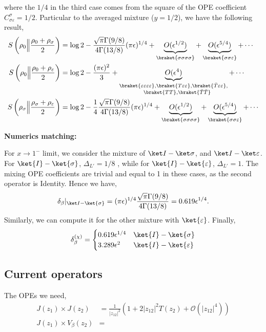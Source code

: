 \documentclass[11pt]{article}
\newcommand{\ep}{\epsilon}
\newcommand{\mO}{\mathcal{O}}
\newcommand{\lb}{\left(}
\newcommand{\rb}{\right)}
\begin{document}
where the $1/4$ in the third case comes from the square of the OPE coefficient $C^\sigma_{\sigma\varepsilon} = 1/2$. Particular to the averaged mixture ($y =1/2$), we have the following result,
\begin{align}
    S\lb \rho_0 \Big\|\frac{\rho_0 + \rho_\sigma}{2}\rb &= \log 2 - \frac{\sqrt \pi \Gamma(9/8)}{4\Gamma (13/8)} (\pi \ep)^{1/4} + \underbrace{O(\ep^{1/2})}_{\braket{\sigma\sigma\sigma\sigma}}+ \underbrace{O(\ep^{5/4})}_{\braket{\sigma\sigma\varepsilon}}+\cdots \\
    S\lb \rho_0 \Big\|\frac{\rho_0 + \rho_\varepsilon}{2}\rb &= \log 2 -  \frac{(\pi \ep)^{2}}{3} + \underbrace{O(\ep^{4})}_{\substack{\braket{\varepsilon\varepsilon\varepsilon\varepsilon} ,\braket{T\varepsilon\varepsilon}, \braket{\bar T \varepsilon\varepsilon},\\\quad \braket{TT},\braket{\bar T \bar T}}}+\cdots \\
    S\lb \rho_\sigma \Big\|\frac{\rho_\sigma + \rho_\varepsilon}{2}\rb &= \log 2 - \frac{1}{4}\frac{\sqrt \pi \Gamma(9/8)}{4\Gamma (13/8)} (\pi \ep)^{1/4} + \underbrace{O(\ep^{1/2})}_{\braket{\sigma\sigma\sigma\sigma}} +\underbrace{O(\ep^{5/4})}_{\braket{\sigma\sigma\varepsilon}}+\cdots 
\end{align}



\textbf{Numerics matching: } 

 For $x \to 1^-$ limit, we consider the mixture of $\ket I -\ket \sigma$, and  $\ket I -\ket \varepsilon$. For $\ket{I}-\ket{\sigma}$, $\Delta_{L'} = 1/8$ , while for $\ket{I}-\ket{\varepsilon}$, $\Delta_{L'} = 1$. The mixing OPE coefficients are trivial and equal to 1 in these cases, as the second operator is Identity. Hence we have,
\begin{align}
    \delta_\beta|_{\ket I-\ket{\sigma}} = (\pi \ep)^{1/4} \frac{\sqrt{\pi} \Gamma(9/8)}{4\Gamma(13/8)} = 0.619 \ep^{1/4}. 
\end{align}
Similarly, we can compute it for the other mixture with $\ket{\varepsilon}$. Finally,
 \begin{align}
     \delta_\beta^{(\chi)} = \begin{cases}
         0.619  \ep^{1/4} & \ket{I}-\ket{\sigma} \\
         3.289 \ep^2 & \ket{I}-\ket{\varepsilon}
     \end{cases}
 \end{align}
\subsection{Current operators}
The OPEs we need,
\begin{align}
    J(z_1)\times J(z_2) &= \frac{1}{|z_{12}|^2}\lb 1 +2|z_{12}|^2 T(z_2) + \mO(|z_{12}|^4) \rb \\
    J(z_1) \times V_\beta (z_2) &= 
\end{align}
\end{document}
